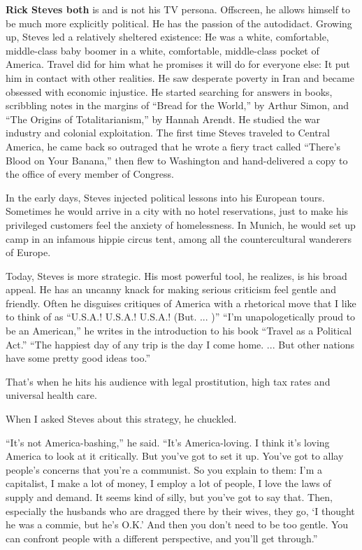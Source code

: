 \textbf{Rick Steves both} is and is not his TV persona. Offscreen, he
allows himself to be much more explicitly political. He has the passion
of the autodidact. Growing up, Steves led a relatively sheltered
existence: He was a white, comfortable, middle-class baby boomer in a
white, comfortable, middle-class pocket of America. Travel did for him
what he promises it will do for everyone else: It put him in contact
with other realities. He saw desperate poverty in Iran and became
obsessed with economic injustice. He started searching for answers in
books, scribbling notes in the margins of ``Bread for the World,'' by
Arthur Simon, and ``The Origins of Totalitarianism,'' by Hannah Arendt.
He studied the war industry and colonial exploitation. The first time
Steves traveled to Central America, he came back so outraged that he
wrote a fiery tract called ``There's Blood on Your Banana,'' then flew
to Washington and hand-delivered a copy to the office of every member of
Congress.

In the early days, Steves injected political lessons into his European
tours. Sometimes he would arrive in a city with no hotel reservations,
just to make his privileged customers feel the anxiety of homelessness.
In Munich, he would set up camp in an infamous hippie circus tent, among
all the countercultural wanderers of Europe.

Today, Steves is more strategic. His most powerful tool, he realizes, is
his broad appeal. He has an uncanny knack for making serious criticism
feel gentle and friendly. Often he disguises critiques of America with a
rhetorical move that I like to think of as ``U.S.A.! U.S.A.! U.S.A.!
(But. ... )'' ``I'm unapologetically proud to be an American,'' he
writes in the introduction to his book ``Travel as a Political Act.''
``The happiest day of any trip is the day I come home. ... But other
nations have some pretty good ideas too.''

That's when he hits his audience with legal prostitution, high tax rates
and universal health care.

When I asked Steves about this strategy, he chuckled.

``It's not America-bashing,'' he said. ``It's America-loving. I think
it's loving America to look at it critically. But you've got to set it
up. You've got to allay people's concerns that you're a communist. So
you explain to them: I'm a capitalist, I make a lot of money, I employ a
lot of people, I love the laws of supply and demand. It seems kind of
silly, but you've got to say that. Then, especially the husbands who are
dragged there by their wives, they go, `I thought he was a commie, but
he's O.K.' And then you don't need to be too gentle. You can confront
people with a different perspective, and you'll get through.''

